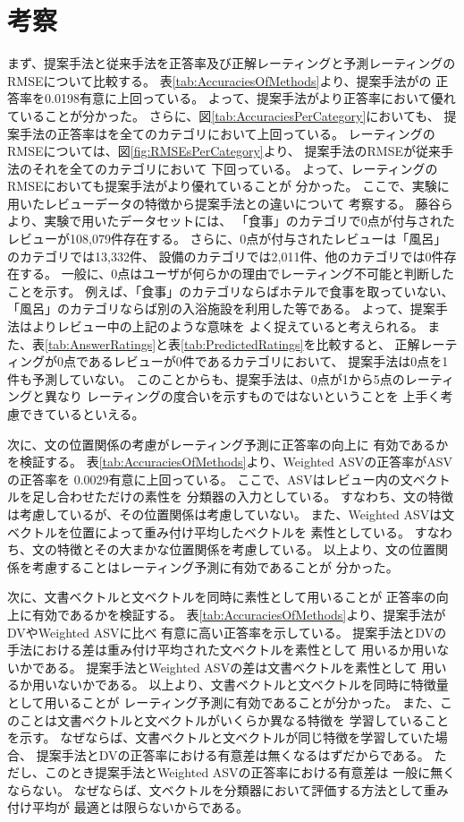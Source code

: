 \section{考察} \label{sec:Discussion}

まず、提案手法と従来手法を正答率及び正解レーティングと予測レーティングの
RMSEについて比較する。
表\ref{tab:AccuraciesOfMethods}より、提案手法が\rival の
正答率を0.0198有意に上回っている。
よって、提案手法が\rival より正答率において優れていることが分かった。
さらに、図\ref{tab:AccuraciesPerCategory}においても、
提案手法の正答率は\rival を全てのカテゴリにおいて上回っている。
レーティングのRMSEについては、図\ref{fig:RMSEsPerCategory}より、
提案手法のRMSEが従来手法\cite{fujitani15}のそれを全てのカテゴリにおいて
下回っている。
よって、レーティングのRMSEにおいても提案手法が\rival より優れていることが
分かった。
ここで、実験に用いたレビューデータの特徴から提案手法と\rival の違いについて
考察する。
藤谷ら\cite{fujitani15}より、実験で用いたデータセットには、
「食事」のカテゴリで0点が付与されたレビューが108,079件存在する。
さらに、0点が付与されたレビューは「風呂」のカテゴリでは13,332件、
設備のカテゴリでは2,011件、他のカテゴリでは0件存在する。
一般に、0点はユーザが何らかの理由でレーティング不可能と判断したことを示す。
例えば、「食事」のカテゴリならばホテルで食事を取っていない、
「風呂」のカテゴリならば別の入浴施設を利用した等である。
よって、提案手法は\rival よりレビュー中の上記のような意味を
よく捉えていると考えられる。
また、表\ref{tab:AnswerRatings}と表\ref{tab:PredictedRatings}を比較すると、
正解レーティングが0点であるレビューが0件であるカテゴリにおいて、
提案手法は0点を1件も予測していない。
このことからも、提案手法は、0点が1から5点のレーティングと異なり
レーティングの度合いを示すものではないということを
上手く考慮できているといえる。

次に、文の位置関係の考慮がレーティング予測に正答率の向上に
有効であるかを検証する。
表\ref{tab:AccuraciesOfMethods}より、Weighted ASVの正答率がASVの正答率を
0.0029有意に上回っている。
ここで、ASVはレビュー内の文ベクトルを足し合わせただけの素性を
分類器の入力としている。
すなわち、文の特徴は考慮しているが、その位置関係は考慮していない。
また、Weighted ASVは文ベクトルを位置によって重み付け平均したベクトルを
素性としている。
すなわち、文の特徴とその大まかな位置関係を考慮している。
以上より、文の位置関係を考慮することはレーティング予測に有効であることが
分かった。

次に、文書ベクトルと文ベクトルを同時に素性として用いることが
正答率の向上に有効であるかを検証する。
表\ref{tab:AccuraciesOfMethods}より、提案手法がDVやWeighted ASVに比べ
有意に高い正答率を示している。
提案手法とDVの手法における差は重み付け平均された文ベクトルを素性として
用いるか用いないかである。
提案手法とWeighted ASVの差は文書ベクトルを素性として
用いるか用いないかである。
以上より、文書ベクトルと文ベクトルを同時に特徴量として用いることが
レーティング予測に有効であることが分かった。
また、このことは文書ベクトルと文ベクトルがいくらか異なる特徴を
学習していることを示す。
なぜならば、文書ベクトルと文ベクトルが同じ特徴を学習していた場合、
提案手法とDVの正答率における有意差は無くなるはずだからである。
ただし、このとき提案手法とWeighted ASVの正答率における有意差は
一般に無くならない。
なぜならば、文ベクトルを分類器において評価する方法として重み付け平均が
最適とは限らないからである。

